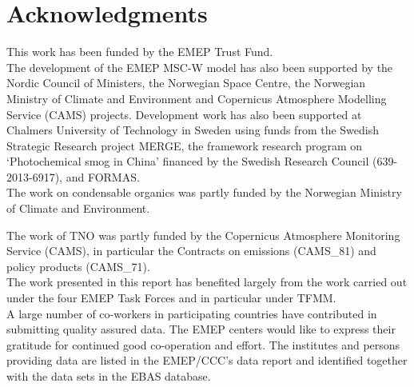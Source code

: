\chapter*{Acknowledgments}

\enlargethispage{3\baselineskip}

\vspace{-2cm}


This work has been funded by the EMEP Trust Fund.\\

The development of the EMEP MSC-W model has also been supported by the Nordic Council of Ministers, the Norwegian Space Centre, the Norwegian Ministry of Climate and Environment and Copernicus Atmosphere Modelling Service (CAMS) projects.
Development work has also been supported at Chalmers University of Technology in Sweden using funds from the Swedish Strategic Research project MERGE, the 
framework research program on `Photochemical smog in China' financed by
the Swedish Research Council (639-2013-6917), and FORMAS.\\

The work on condensable organics was partly funded by the Norwegian Ministry of Climate and Environment. 


The work of TNO was partly funded
by the Copernicus Atmosphere Monitoring Service (CAMS),
in particular the Contracts on emissions (CAMS\_81) and policy products
(CAMS\_71).\\

The work presented in this report has benefited largely from the work carried out under the four EMEP Task Forces and in particular under TFMM.\\

A large number of co-workers in participating countries have contributed in submitting quality assured data. The EMEP centers would like to express their gratitude for continued good co-operation and effort. The institutes and persons providing data are listed in the EMEP/CCC's data report and identified together with the data sets in the EBAS database. \\

